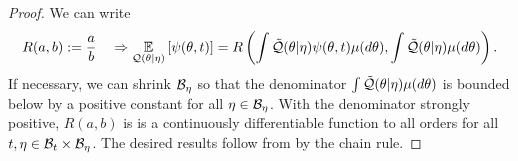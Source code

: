 \begin{lem}
%
%
\begin{proof}
%
We can write
%
\begin{align*}
%
R(a, b) :={} \frac{a}{b} \quad \Rightarrow
\expect{\q(\theta \vert \eta)}{\psi(\theta, \t)} ={}
R\left(\int \qtil(\theta \vert \eta) \psi(\theta, \t) \mu(d\theta),
  \int \qtil(\theta \vert \eta) \mu(d\theta)\right).
%
\end{align*}
%
If necessary, we can shrink $\mathcal{B}_\eta$ so that the denominator $\int
\tilde{\mathcal{Q}}(\theta \vert \eta) \mu(d\theta)$ is bounded below by a positive constant
for all $\eta \in \mathcal{B}_\eta$.  With the denominator strongly positive, $R(a,b)$
is is a continuously differentiable function to all orders for all $t, \eta \in
\mathcal{B}_t \times \mathcal{B}_\eta$.  The desired results follow from
 by the chain rule.

\end{proof}
%
\end{lem}

